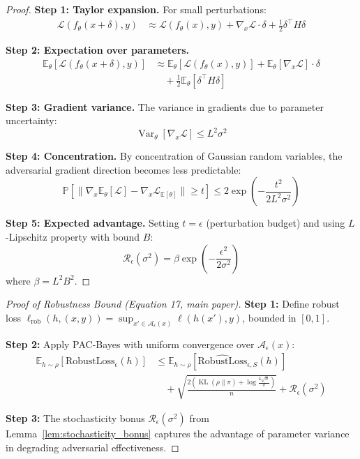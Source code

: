 \documentclass[12pt,a4paper]{article}
\theoremstyle{definition}
\DeclareMathOperator{\KL}{KL}
\DeclareMathOperator{\Var}{Var}
\begin{document}
\begin{proof}
\textbf{Step 1: Taylor expansion.}
For small perturbations:
\begin{align}
\mathcal{L}(f_\theta(x+\delta), y) &\approx \mathcal{L}(f_\theta(x), y) + \nabla_x \mathcal{L} \cdot \delta + \frac{1}{2}\delta^\top H \delta
\end{align}

\textbf{Step 2: Expectation over parameters.}
\begin{align}
\mathbb{E}_\theta[\mathcal{L}(f_\theta(x+\delta), y)] &\approx \mathbb{E}_\theta[\mathcal{L}(f_\theta(x), y)] + \mathbb{E}_\theta[\nabla_x \mathcal{L}] \cdot \delta \\
&\quad + \frac{1}{2}\mathbb{E}_\theta[\delta^\top H \delta]
\end{align}

\textbf{Step 3: Gradient variance.}
The variance in gradients due to parameter uncertainty:
\begin{equation}
\Var_\theta[\nabla_x \mathcal{L}] \leq L^2 \sigma^2
\end{equation}

\textbf{Step 4: Concentration.}
By concentration of Gaussian random variables, the adversarial gradient direction becomes less predictable:
\begin{equation}
\mathbb{P}[\|\nabla_x \mathbb{E}_\theta[\mathcal{L}] - \nabla_x \mathcal{L}_{\mathbb{E}[\theta]}\| \geq t] \leq 2\exp\left(-\frac{t^2}{2L^2\sigma^2}\right)
\end{equation}

\textbf{Step 5: Expected advantage.}
Setting $t = \epsilon$ (perturbation budget) and using $L$-Lipschitz property with bound $B$:
\begin{equation}
\mathcal{R}_\epsilon(\sigma^2) = \beta \exp\left(-\frac{\epsilon^2}{2\sigma^2}\right)
\end{equation}
where $\beta = L^2 B^2$.
\end{proof}

\begin{proof}[Proof of Robustness Bound (Equation 17, main paper)]
\textbf{Step 1:} Define robust loss $\ell_{\text{rob}}(h, (x,y)) = \sup_{x' \in \mathcal{A}_\epsilon(x)} \ell(h(x'), y)$, bounded in $[0,1]$.

\textbf{Step 2:} Apply PAC-Bayes with uniform convergence over $\mathcal{A}_\epsilon(x)$:
\begin{align}
\mathbb{E}_{h\sim\rho}[\text{RobustLoss}_\epsilon(h)] &\leq \mathbb{E}_{h\sim\rho}[\widehat{\text{RobustLoss}}_{\epsilon,S}(h)] \\
&\quad + \sqrt{\frac{2(\KL(\rho\|\pi) + \log\frac{4\sqrt{n}}{\delta})}{n}} + \mathcal{R}_\epsilon(\sigma^2)
\end{align}

\textbf{Step 3:} The stochasticity bonus $\mathcal{R}_\epsilon(\sigma^2)$ from Lemma~\ref{lem:stochasticity_bonus} captures the advantage of parameter variance in degrading adversarial effectiveness.
\end{proof}
\end{document}
